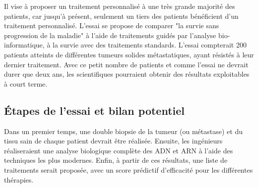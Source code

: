 \documentclass[12pt, openany]{report}
\begin{document}
\begin{figure}[htbp]
  \centering
  \hfill
{}\hfill
\end{figure}

Il vise à proposer un traitement personnalisé à une très grande majorité des patients, car jusqu’à présent, seulement un tiers des patients bénéficient d’un traitement personnalisé. L'essai se propose de comparer "la survie sans progression de la maladie" à l’aide de traitements guidés par l'analyse bio-informatique, à la survie avec des traitements standards.
L’essai compterait 200 patients atteints de différentes tumeurs solides métastatiques, ayant résistés à leur dernier traitement. Avec ce petit nombre de patients et comme l’essai ne devrait durer que deux ans, les scientifiques pourraient obtenir des résultats exploitables à court terme.
 
\subsection{Étapes de l’essai et bilan potentiel}

Dans un premier temps, une double biopsie de la tumeur (ou métastase) et du tissu sain de chaque patient devrait être réalisée. Ensuite, les ingénieurs réaliseraient une analyse biologique complète des ADN et  ARN à l’aide des techniques les plus modernes. Enfin, à partir de ces résultats, une liste de traitements serait proposée, avec un score prédictif d’efficacité pour les différentes thérapies. 
\end{document}
